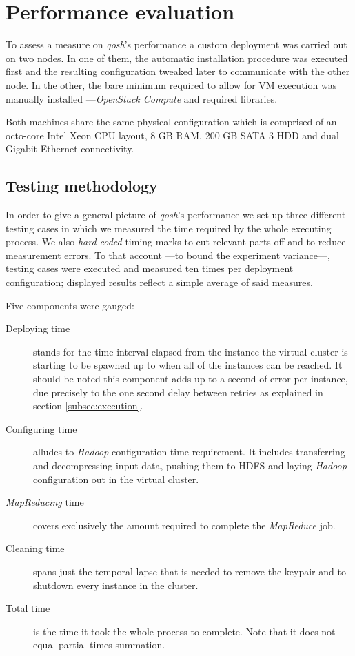 \documentclass{sig-alternate}
\begin{document}
\section{Performance evaluation}\label{sec:performance}
\noindent To assess a measure on \emph{qosh}'s performance a custom deployment was carried out on two nodes. In one of them, the automatic installation procedure was executed first and the resulting configuration tweaked later to communicate with the other node. In the other, the bare minimum required to allow for VM execution was manually installed ---\emph{OpenStack Compute} and required libraries.

Both machines share the same physical configuration which is comprised of an octo-core Intel Xeon CPU layout, 8 GB RAM, 200 GB SATA 3 HDD and dual Gigabit Ethernet connectivity.

\subsection{Testing methodology}\label{subsec:methodology}
\noindent In order to give a general picture of \emph{qosh}'s performance we set up three different testing cases in which we measured the time required by the whole executing process. We also \emph{hard coded} timing marks to cut relevant parts off and to reduce measurement errors. To that account ---to bound the experiment variance---, testing cases were executed and measured ten times per deployment configuration; displayed results reflect a simple average of said measures.

Five components were gauged:
\begin{description}
 \item[Deploying time] stands for the time interval elapsed from the instance the virtual cluster is starting to be spawned up to when all of the instances can be reached. It should be noted this component adds up to a second of error per instance, due precisely to the one second delay between retries as explained in section \ref{subsec:execution}.
 \item[Configuring time] alludes to \emph{Hadoop} configuration time requirement. It includes transferring and decompressing input data, pushing them to HDFS and laying \emph{Hadoop} configuration out in the virtual cluster.
 \item[\emph{MapReducing} time] covers exclusively the amount required to complete the \emph{MapReduce} job.
 \item[Cleaning time] spans just the temporal lapse that is needed to remove the keypair and to shutdown every instance in the cluster.
 \item[Total time] is the time it took the whole process to complete. Note that it does not equal partial times summation.
\end{description}
\end{document}
